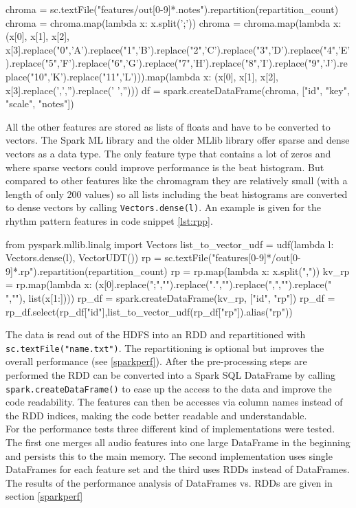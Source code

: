 \begin{pythonCode}[frame=single,label={lst:prep1},caption={notes preprocessing},captionpos=b]
chroma = sc.textFile("features/out[0-9]*.notes").repartition(repartition_count)
chroma = chroma.map(lambda x: x.split(';'))
chroma = chroma.map(lambda x: (x[0], x[1], x[2], x[3].replace("0",'A').replace("1",'B').replace("2",'C').replace("3",'D').replace("4",'E').replace("5",'F').replace("6",'G').replace("7",'H').replace("8",'I').replace("9",'J').replace("10",'K').replace("11",'L'))).map(lambda x: (x[0], x[1], x[2], x[3].replace(',','').replace(' ','')))
df = spark.createDataFrame(chroma, ["id", "key", "scale", "notes"])
\end{pythonCode}

\noindent All the other features are stored as lists of floats and have to be converted to vectors. The Spark ML library and the older MLlib library offer sparse and dense vectors as a data type. The only feature type that contains a lot of zeros and where sparse vectors could improve performance is the beat histogram. But compared to other features like the chromagram they are relatively small (with a length of only 200 values) so all lists including the beat histograms are converted to dense vectors by calling \lstinline{Vectors.dense(l)}. An example is given for the rhythm pattern features in code snippet \ref{lst:rpp}.

\begin{pythonCode}[frame=single,label={lst:rpp},caption={rp preprocessing},captionpos=b]
from pyspark.mllib.linalg import Vectors
list_to_vector_udf = udf(lambda l: Vectors.dense(l), VectorUDT())
rp = sc.textFile("features[0-9]*/out[0-9]*.rp").repartition(repartition_count)
rp = rp.map(lambda x: x.split(","))
kv_rp = rp.map(lambda x: (x[0].replace(";","").replace(".","").replace(",","").replace(" ",""), list(x[1:])))
rp_df = spark.createDataFrame(kv_rp, ["id", "rp"])
rp_df = rp_df.select(rp_df["id"],list_to_vector_udf(rp_df["rp"]).alias("rp"))
\end{pythonCode}

\noindent The data is read out of the HDFS into an RDD and repartitioned with \lstinline{sc.textFile("name.txt")}. The repartitioning is optional but improves the overall performance (see \ref{sparkperf}). After the pre-processing steps are performed the RDD can be converted into a Spark SQL DataFrame by calling \lstinline{spark.createDataFrame()} to ease up the access to the data and improve the code readability. The features can then be accesses via column names instead of the RDD indices, making the code better readable and understandable.\\
For the performance tests three different kind of implementations were tested. The first one merges all audio features into one large DataFrame in the beginning and persists this to the main memory. The second implementation uses single DataFrames for each feature set and the third uses RDDs instead of DataFrames. The results of the performance analysis of DataFrames vs. RDDs are given in section \ref{sparkperf}

